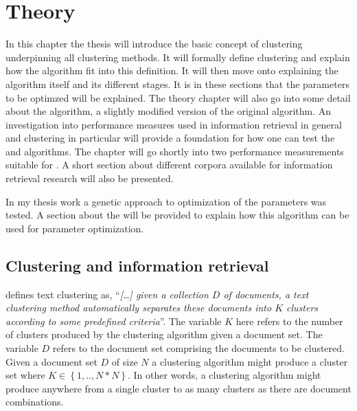 
\chapter{Theory} %
\label{Theory} %

In this chapter the thesis will introduce the basic concept of clustering underpinning all clustering methods. It will formally define clustering and explain how the \STC algorithm fit into this definition. It will then move onto explaining the \STC algorithm itself and its different stages. It is in these sections that the parameters to be optimzed will be explained. The theory chapter will also go into some detail about the \CTC algorithm, a slightly modified version of the original \STC algorithm. An investigation into performance measures used in information retrieval in general and clustering in particular will provide a foundation for how one can test the \STC and \CTC algorithms. The chapter will go shortly into two performance measurements suitable for \CTC. A short section about different corpora available for information retrieval research will also be presented.

In my thesis work a genetic approach to optimization of the parameters was tested. A section about the \GA will be provided to explain how this algorithm can be used for parameter optimization.

\section{Clustering and information retrieval}
\label{Clustering}
\citeauthor{Baeza-Yates2011a} defines text clustering as, ``\textit{[\dots] given a collection \(D\) of documents, a text clustering method automatically separates these documents into \(K\) clusters according to some predefined criteria}''. The variable \(K\) here refers to the number of clusters produced by the clustering algorithm given a document set. The variable \(D\) refers to the document set comprising the documents to be clustered. Given a document set \(D\) of size \(N\) a clustering algorithm might produce a cluster set where \(K \in \left\{1, .., N*N\right\}\). In other words, a clustering algorithm might produce anywhere from a single cluster to as many clusters as there are document combinations.

